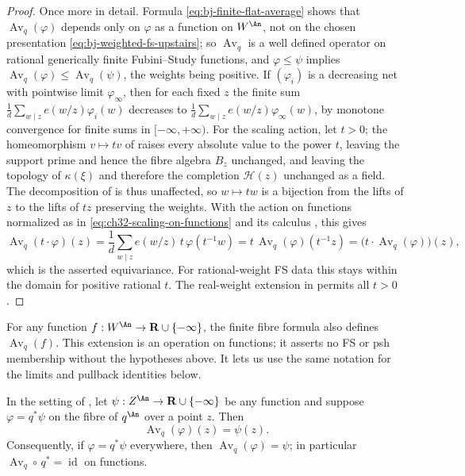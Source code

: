 \begin{proof}
Once more in detail.  Formula \eqref{eq:bj-finite-flat-average} shows that
$\operatorname{Av}_q(\varphi)$ depends only on $\varphi$ as a function
on $W^{\An}$, not on the chosen presentation
\eqref{eq:bj-weighted-fs-upstairs}; so $\operatorname{Av}_q$ is a well
defined operator on rational generically finite Fubini--Study functions,
and $\varphi\le\psi$ implies
$\operatorname{Av}_q(\varphi)\le\operatorname{Av}_q(\psi)$, the weights
being positive.  If $(\varphi_i)$ is a decreasing net with pointwise
limit $\varphi_\infty$, then for each fixed $z$ the finite sum
$\frac1d\sum_{w\mid z}e(w/z)\varphi_i(w)$ decreases to
$\frac1d\sum_{w\mid z}e(w/z)\varphi_\infty(w)$, by monotone convergence
for finite sums in $[-\infty,+\infty)$.  For the scaling action, let
$t>0$; the homeomorphism $v\mapsto tv$ of
 raises every absolute value to the power
$t$, leaving the support prime and hence the fibre algebra $B_z$
unchanged, and leaving the topology of $\kappa(\xi)$ and therefore the
completion $\mathcal H(z)$ unchanged as a field.  The decomposition of
 is thus unaffected, so $w\mapsto tw$
is a bijection from the lifts of $z$ to the lifts of $tz$ preserving the
weights.  With the action on functions normalized as in
\eqref{eq:ch32-scaling-on-functions} and its calculus
, this gives
\[
 \operatorname{Av}_q(t\cdot\varphi)(z)
 =\frac1d\sum_{w\mid z}e(w/z)\,t\,\varphi(t^{-1}w)
 =t\,\operatorname{Av}_q(\varphi)(t^{-1}z)
 =\bigl(t\cdot\operatorname{Av}_q(\varphi)\bigr)(z),
\]
which is
the asserted equivariance.  For rational-weight FS data this stays
within the domain for positive rational $t$.  The real-weight extension
in  permits all $t>0$.
\end{proof}

For any function $f:W^{\An}\to\mathbf R\cup\{-\infty\}$, the finite
fibre formula also defines $\operatorname{Av}_q(f)$.
This extension is an operation on functions; it asserts no FS or psh
membership without the hypotheses above.  It lets us use the same
notation for the limits and pullback identities below.

\begin{corollary}
\label{cor:ch41-average-pullback}
In the setting of , let
$\psi:Z^{\An}\to\mathbf R\cup\{-\infty\}$ be any function and suppose
$\varphi=q^*\psi$ on the fibre of $q^{\An}$ over a point $z$.  Then
\[
 \operatorname{Av}_q(\varphi)(z)=\psi(z).
\]
Consequently, if $\varphi=q^*\psi$ everywhere, then
$\operatorname{Av}_q(\varphi)=\psi$; in particular
$\operatorname{Av}_q\circ\,q^*=\operatorname{id}$ on functions.
\end{corollary}

